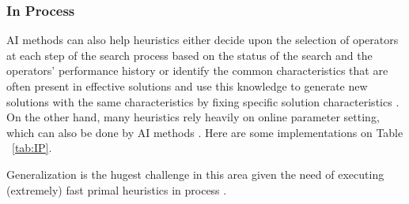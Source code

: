 \documentclass[a4paper]{article}
\begin{document}
\begin{table}[h]
\centering
\caption{Methods on initialization}\label{tab:INI}
\end{table}

\subsubsection{In Process}
AI methods can also help heuristics either decide upon the selection of operators at each step of the search process based on the status of the search and the operators' performance history \citep{Karimi2} or identify the common characteristics that are often present in effective solutions and use this knowledge to generate new solutions with the same characteristics by fixing specific solution characteristics \citep{Fairee, Huang}. On the other hand, many heuristics rely heavily on online parameter setting, which can also be done by AI methods \citep{Oztop}. Here are some implementations on Table ~\ref{tab:IP}.

Generalization is the hugest challenge in this area given the need of executing (extremely) fast primal heuristics in process \citep{Scavuzzo}.
\end{document}
